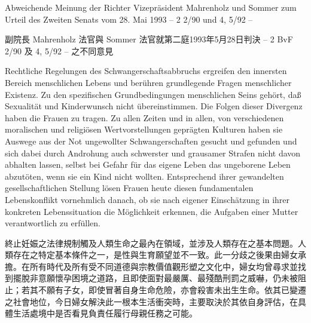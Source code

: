\documentclass[12pt]{article}
\begin{document}

\begin{sourcepara}[title={原文SondervotumMS.268}]
Abweichende Meinung der Richter Vizepräsident Mahrenholz und Sommer zum Urteil des Zweiten Senats vom 28. Mai 1993 -- 2 \abbrBvF{} 2/90 und 4, 5/92 --
\end{sourcepara}
\begin{transpara}
副院長 Mahrenholz 法官與 Sommer 法官就第二庭1993年5月28日判決 -- 2 BvF 2/90 及 4, 5/92 -- 之不同意見
\end{transpara}

\begin{sourcepara}[title={原文SondervotumMS.269}]
Rechtliche Regelungen des Schwangerschaftsabbruchs ergreifen den innersten Bereich menschlichen Lebens und berühren grundlegende Fragen menschlicher Existenz. Zu den spezifischen Grundbedingungen menschlichen Seins gehört, daß Sexualität und Kinderwunsch nicht übereinstimmen. Die Folgen dieser Divergenz haben die Frauen zu tragen. Zu allen Zeiten und in allen, von verschiedenen moralischen und religiösen Wertvorstellungen geprägten Kulturen haben sie Auswege aus der Not ungewollter Schwangerschaften gesucht und gefunden und sich dabei durch Androhung auch schwerster und grausamer Strafen nicht davon abhalten lassen, selbst bei Gefahr für das eigene Leben das ungeborene Leben abzutöten, wenn sie ein Kind nicht wollten. Entsprechend ihrer gewandelten gesellschaftlichen Stellung lösen Frauen heute diesen fundamentalen Lebenskonflikt vornehmlich danach, ob sie nach eigener Einschätzung in ihrer konkreten Lebenssituation die Möglichkeit erkennen, die Aufgaben einer Mutter verantwortlich zu erfüllen.
\end{sourcepara}
\begin{transpara}
終止妊娠之法律規制觸及人類生命之最內在領域，並涉及人類存在之基本問題。人類存在之特定基本條件之一，是性與生育願望並不一致。此一分歧之後果由婦女承擔。在所有時代及所有受不同道德與宗教價值觀形塑之文化中，婦女均曾尋求並找到擺脫非意願懷孕困境之道路，且即使面對最嚴厲、最殘酷刑罰之威嚇，仍未被阻止；若其不願有子女，即使冒著自身生命危險，亦會殺害未出生生命。依其已變遷之社會地位，今日婦女解決此一根本生活衝突時，主要取決於其依自身評估，在具體生活處境中是否看見負責任履行母親任務之可能。
\end{transpara}
\end{document}
